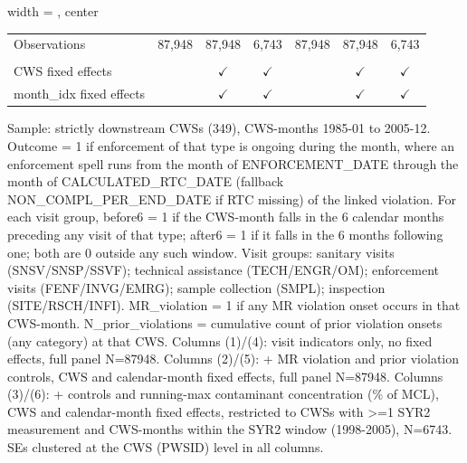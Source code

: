 \begin{table}[htbp]
\begin{adjustbox}{width = \textwidth, center}
\begin{tabular}{lcccccc}
          \\
         
         Observations                                & 87,948          & 87,948                 & 6,743         & 87,948         & 87,948         & 6,743\\  
         
          \\
         
         CWS fixed effects                           &                 & $\checkmark$           & $\checkmark$  &                & $\checkmark$   & $\checkmark$\\   
         month\_idx fixed effects                    &                 & $\checkmark$           & $\checkmark$  &                & $\checkmark$   & $\checkmark$\\   
         
         \bottomrule
         
      \end{tabular}
      
      
      
   \end{adjustbox}
      {\tiny\linespread{1}\selectfont \par \raggedright 
   Sample: strictly downstream CWSs (349), CWS-months 1985-01 to 2005-12. Outcome = 1 if enforcement of that type is ongoing during the month, where an enforcement spell runs from the month of ENFORCEMENT\_DATE through the month of CALCULATED\_RTC\_DATE (fallback NON\_COMPL\_PER\_END\_DATE if RTC missing) of the linked violation. For each visit group, before6 = 1 if the CWS-month falls in the 6 calendar months preceding any visit of that type; after6 = 1 if it falls in the 6 months following one; both are 0 outside any such window. Visit groups: sanitary visits (SNSV/SNSP/SSVF); technical assistance (TECH/ENGR/OM); enforcement visits (FENF/INVG/EMRG); sample collection (SMPL); inspection (SITE/RSCH/INFI). MR\_violation = 1 if any MR violation onset occurs in that CWS-month. N\_prior\_violations = cumulative count of prior violation onsets (any category) at that CWS. Columns (1)/(4): visit indicators only, no fixed effects, full panel N=87948. Columns (2)/(5): + MR violation and prior violation controls, CWS and calendar-month fixed effects, full panel N=87948. Columns (3)/(6): + controls and running-max contaminant concentration (\% of MCL), CWS and calendar-month fixed effects, restricted to CWSs with >=1 SYR2 measurement and CWS-months within the SYR2 window (1998-2005), N=6743. SEs clustered at the CWS (PWSID) level in all columns.}
   
\end{table}


